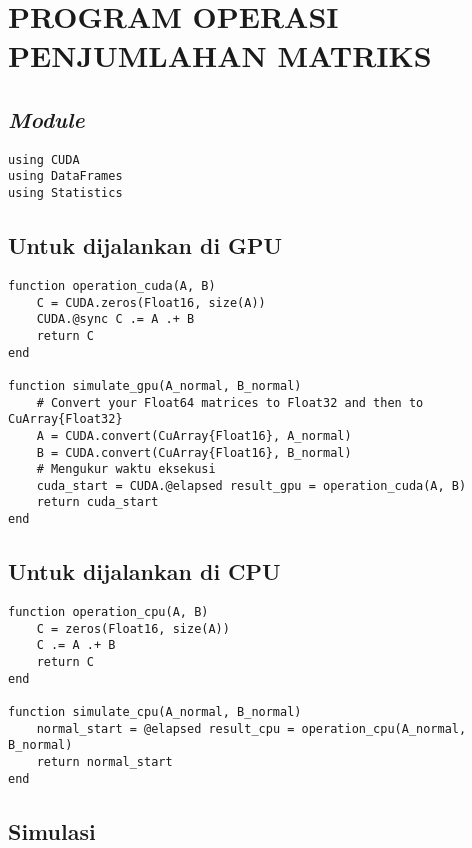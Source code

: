 \chapter{PROGRAM OPERASI PENJUMLAHAN MATRIKS}
\label{appx:addition}

\section{\emph{Module}}

\begin{lstlisting}
using CUDA
using DataFrames
using Statistics
\end{lstlisting}

\section{Untuk dijalankan di GPU}

\begin{lstlisting}
function operation_cuda(A, B)
    C = CUDA.zeros(Float16, size(A))
    CUDA.@sync C .= A .+ B
    return C
end

function simulate_gpu(A_normal, B_normal)
    # Convert your Float64 matrices to Float32 and then to CuArray{Float32}
    A = CUDA.convert(CuArray{Float16}, A_normal)
    B = CUDA.convert(CuArray{Float16}, B_normal)
    # Mengukur waktu eksekusi
    cuda_start = CUDA.@elapsed result_gpu = operation_cuda(A, B)
    return cuda_start
end
\end{lstlisting}

\section{Untuk dijalankan di CPU}

\begin{lstlisting}
function operation_cpu(A, B)
    C = zeros(Float16, size(A))
    C .= A .+ B
    return C
end

function simulate_cpu(A_normal, B_normal)
    normal_start = @elapsed result_cpu = operation_cpu(A_normal, B_normal)
    return normal_start
end
\end{lstlisting}

\section{Simulasi}


